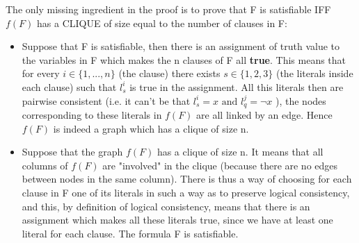 The only missing ingredient in the proof is to prove that F is satisfiable IFF \(f(F)\) has a CLIQUE of size equal to the number of clauses in F:
\begin{itemize}
	\item Suppose that F is satisfiable, then there is an assignment of truth value to the variables in F which makes the n clauses of F all \textbf{true}. This means that for every \(i \in \{1,...,n\}\) (the clause) there exists \(s \in \{1,2,3\}\) (the literals inside each clause) such that \(l_s^i\) is true in the assignment. All this literals then are pairwise consistent (i.e. it can't be that \(l_s^i=x \text{ and } l_q^j =\lnot x\) ), the nodes corresponding to these literals in \(f(F)\) are all linked by an edge. Hence \(f(F)\) is indeed a graph which has a clique of size n.
	\item Suppose that the graph \(f(F)\) has a clique of size n. It means that all columns of \(f(F)\) are "involved" in the clique (because there are no edges between nodes in the same column). There is thus a way of choosing for each clause in F one of its literals in such a way as to preserve logical consistency, and this, by definition of logical consistency, means that there is an assignment which makes all these literals true, since we have at least one literal for each clause. The formula F is satisfiable.
\end{itemize}

